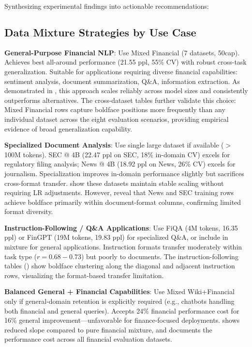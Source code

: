 Synthesizing experimental findings into actionable recommendations:

\subsection{Data Mixture Strategies by Use Case}

\textbf{General-Purpose Financial NLP}: Use Mixed Financial (7 datasets, 50cap). Achieves best all-around performance (21.55 ppl, 55\% CV) with robust cross-task generalization. Suitable for applications requiring diverse financial capabilities: sentiment analysis, document summarization, Q\&A, information extraction. As demonstrated in , this approach scales reliably across model sizes and consistently outperforms alternatives. The cross-dataset tables further validate this choice: Mixed Financial rows capture boldface positions more frequently than any individual dataset across the eight evaluation scenarios, providing empirical evidence of broad generalization capability.

\textbf{Specialized Document Analysis}: Use single large dataset if available ($>$ 100M tokens). SEC @ 4B (22.47 ppl on SEC, 18\% in-domain CV) excels for regulatory filing analysis; News @ 4B (18.92 ppl on News, 26\% CV) excels for journalism. Specialization improves in-domain performance slightly but sacrifices cross-format transfer.  show these datasets maintain stable scaling without requiring LR adjustments. However,  reveal that News and SEC training rows achieve boldface primarily within document-format columns, confirming limited format diversity.

\textbf{Instruction-Following / Q\&A Applications}: Use FiQA (4M tokens, 16.35 ppl) or FinGPT (19M tokens, 19.83 ppl) for specialized Q\&A, or include in mixture for general applications. Instruction formats transfer moderately within task type ($r = 0.68-0.73$) but poorly to documents. The instruction-following tables () show boldface clustering along the diagonal and adjacent instruction rows, visualizing the format-based transfer limitation.

\textbf{Balanced General + Financial Capabilities}: Use Mixed Wiki+Financial only if general-domain retention is explicitly required (e.g., chatbots handling both financial and general queries). Accepts 24\% financial performance cost for 16\% general improvement—unfavorable for finance-focused deployments.  shows reduced slope compared to pure financial mixture, and  documents the performance cost across all financial evaluation datasets.

